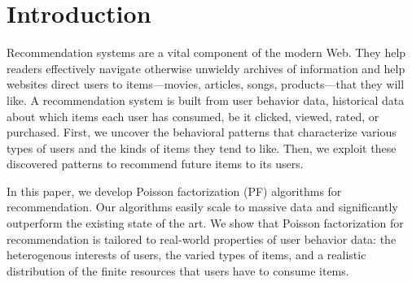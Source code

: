 \section{Introduction}

Recommendation systems are a vital component of the modern Web.  They
help readers effectively navigate otherwise unwieldy archives of
information and help websites direct users to items---movies,
articles, songs, products---that they will like.
A recommendation system is built from user behavior data, historical
data about which items each user has consumed, be it clicked, viewed,
rated, or purchased. First, we uncover the behavioral patterns that
characterize various types of users and the kinds of items they tend
to like.  Then, we exploit these discovered patterns to recommend
future items to its users.

In this paper, we develop Poisson factorization (PF) algorithms for
recommendation.  Our algorithms easily scale to massive data and
significantly outperform the existing state of the art.  We show that
Poisson factorization for recommendation is tailored to real-world
properties of user behavior data: the heterogenous interests of users,
the varied types of items, and a realistic distribution of the finite
resources that users have to consume items.


